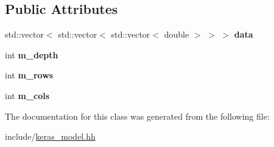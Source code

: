 \subsection*{Public Attributes}
\begin{DoxyCompactItemize}
\item 
\mbox{\label{classkeras_1_1_data_chunk2_d_af7e21082a12e6e33c41f73cfb7cca94e}} 
std\+::vector$<$ std\+::vector$<$ std\+::vector$<$ double $>$ $>$ $>$ {\bfseries data}
\item 
\mbox{\label{classkeras_1_1_data_chunk2_d_a4091feba923b0934a153b48f419fd8f4}} 
int {\bfseries m\+\_\+depth}
\item 
\mbox{\label{classkeras_1_1_data_chunk2_d_ab6fe28d4535c6bedb65e3cfd72d6f3a9}} 
int {\bfseries m\+\_\+rows}
\item 
\mbox{\label{classkeras_1_1_data_chunk2_d_a725be452bc01342f51591b115ae1b6e7}} 
int {\bfseries m\+\_\+cols}
\end{DoxyCompactItemize}


The documentation for this class was generated from the following file\+:\begin{DoxyCompactItemize}
\item 
include/\mbox{\hyperlink{keras__model_8hh}{keras\+\_\+model.\+hh}}\end{DoxyCompactItemize}
